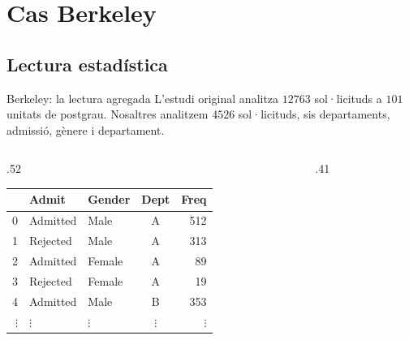 \documentclass{bestbeamer}
\begin{document}
\section{Cas Berkeley}
\subsection{Lectura estadística}

\begin{frame}{Berkeley: la lectura agregada}
L'estudi original analitza $12763$ sol·licituds a $101$ unitats de postgrau. Nosaltres analitzem $4526$ sol·licituds, sis departaments, admissió, gènere i departament.
\vfill
  \begin{columns}[T,onlytextwidth]
    \begin{column}{.52\textwidth}
      \centering
      \begin{table}
        \centering
        \footnotesize
        \setlength{\tabcolsep}{4pt}
        \renewcommand{\arraystretch}{1.1}
        \begin{tabular}{@{}>{\color{bestDiagramMuted}}rllcr@{}}
          \toprule
          & \textbf{Admit} & \textbf{Gender} & \textbf{Dept} & \textbf{Freq}\\
          \midrule
          0 & Admitted & Male   & A & 512\\
          1 & Rejected & Male   & A & 313\\
          2 & Admitted & Female & A & 89\\
          3 & Rejected & Female & A & 19\\
          4 & Admitted & Male   & B & 353 \\
          $\vdots$ & $\vdots$ & $\vdots$ & $\vdots$ & $\vdots$ \\
          \bottomrule
        \end{tabular}
      \end{table}
    \end{column}
    \begin{column}{.41\textwidth}
    \centering
    \end{column}
  \end{columns}
\end{frame}
\end{document}
